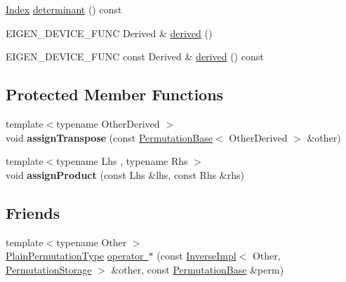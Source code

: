 \begin{DoxyCompactItemize}
\item 
\mbox{\hyperlink{struct_eigen_1_1_eigen_base_a554f30542cc2316add4b1ea0a492ff02}{Index}} \mbox{\hyperlink{class_eigen_1_1_permutation_base_a1fc7a5823544700c2e0795e87f9c6d09}{determinant}} () const
\item 
E\+I\+G\+E\+N\+\_\+\+D\+E\+V\+I\+C\+E\+\_\+\+F\+U\+NC Derived \& \mbox{\hyperlink{class_eigen_1_1_permutation_base_a324b16961a11d2ecfd2d1b7dd7946545}{derived}} ()
\item 
E\+I\+G\+E\+N\+\_\+\+D\+E\+V\+I\+C\+E\+\_\+\+F\+U\+NC const Derived \& \mbox{\hyperlink{class_eigen_1_1_permutation_base_ad0cbee5e2dfef3bbe9db5e6d5fe12cc0}{derived}} () const
\end{DoxyCompactItemize}
\subsection*{Protected Member Functions}
\begin{DoxyCompactItemize}
\item 
\mbox{\label{class_eigen_1_1_permutation_base_aff404e827d6d025a3ea95bbfe9b37084}} 
{\footnotesize template$<$typename Other\+Derived $>$ }\\void {\bfseries assign\+Transpose} (const \mbox{\hyperlink{class_eigen_1_1_permutation_base}{Permutation\+Base}}$<$ Other\+Derived $>$ \&other)
\item 
\mbox{\label{class_eigen_1_1_permutation_base_a0af2afc7b461dd3e44b4d8a9948ae512}} 
{\footnotesize template$<$typename Lhs , typename Rhs $>$ }\\void {\bfseries assign\+Product} (const Lhs \&lhs, const Rhs \&rhs)
\end{DoxyCompactItemize}
\subsection*{Friends}
\begin{DoxyCompactItemize}
\item 
{\footnotesize template$<$typename Other $>$ }\\\mbox{\hyperlink{class_eigen_1_1_permutation_matrix}{Plain\+Permutation\+Type}} \mbox{\hyperlink{class_eigen_1_1_permutation_base_a0fb5d478cbe66c99d1b9bb6d88093aed}{operator $\ast$}} (const \mbox{\hyperlink{class_eigen_1_1_inverse_impl}{Inverse\+Impl}}$<$ Other, \mbox{\hyperlink{struct_eigen_1_1_permutation_storage}{Permutation\+Storage}} $>$ \&other, const \mbox{\hyperlink{class_eigen_1_1_permutation_base}{Permutation\+Base}} \&perm)
\end{DoxyCompactItemize}



